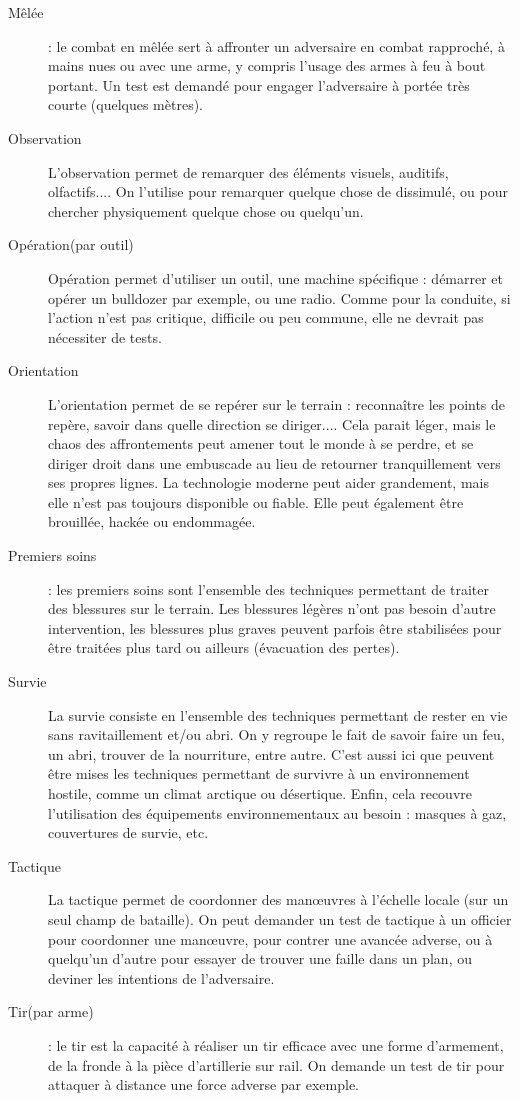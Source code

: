 \documentclass{report}
\begin{document}
\begin{multicols}{2}
\begin{description}
    \item[Mêlée]: le combat en mêlée sert à affronter un adversaire en combat rapproché, à mains nues ou avec une arme, y compris l'usage des armes à feu à bout portant. Un test est demandé pour engager l'adversaire à portée très courte (quelques mètres).
    \item[Observation] L'observation permet de remarquer des éléments visuels, auditifs, olfactifs.... On l'utilise pour remarquer quelque chose de dissimulé, ou pour chercher physiquement quelque chose ou quelqu'un.
    \item[Opération(par outil)] Opération permet d'utiliser un outil, une machine spécifique : démarrer et opérer un bulldozer par exemple, ou une radio. Comme pour la conduite, si l'action n'est pas critique, difficile ou peu commune, elle ne devrait pas nécessiter de tests.
    \item[Orientation] L'orientation permet de se repérer sur le terrain : reconnaître les points de repère, savoir dans quelle direction se diriger.... Cela parait léger, mais le chaos des affrontements peut amener tout le monde à se perdre, et se diriger droit dans une embuscade au lieu de retourner tranquillement vers ses propres lignes. La technologie moderne peut aider grandement, mais elle n'est pas toujours disponible ou fiable. Elle peut également être brouillée, hackée ou endommagée.
    \item[Premiers soins]: les premiers soins sont l'ensemble des techniques permettant de traiter des blessures sur le terrain. Les blessures légères n'ont pas besoin d'autre intervention, les blessures plus graves peuvent parfois être stabilisées pour être traitées plus tard ou ailleurs (évacuation des pertes).
    \item[Survie] La survie consiste en l'ensemble des techniques permettant de rester en vie sans ravitaillement et/ou abri. On y regroupe le fait de savoir faire un feu, un abri, trouver de la nourriture, entre autre. C'est aussi ici que peuvent être mises les techniques permettant de survivre à un environnement hostile, comme un climat arctique ou désertique. Enfin, cela recouvre l'utilisation des équipements environnementaux au besoin : masques à gaz, couvertures de survie, etc.
    \item[Tactique]La tactique permet de coordonner des manœuvres à l'échelle locale (sur un seul champ de bataille). On peut demander un test de tactique à un officier pour coordonner une manœuvre, pour contrer une avancée adverse, ou à quelqu'un d'autre pour essayer de trouver une faille dans un plan, ou deviner les intentions de l'adversaire.
    \item[Tir(par arme)]: le tir est la capacité à réaliser un tir efficace avec une forme d'armement, de la fronde à la pièce d'artillerie sur rail. On demande un test de tir pour attaquer à distance une force adverse par exemple.
\end{description}

\end{multicols}
\end{document}
